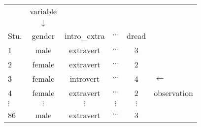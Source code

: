 \documentclass[convert]{standalone}
\begin{document}
    
\begin{tabular}{l cccc l}
		& variable \\
		& $\downarrow$	 \\
\cline{1-5}
Stu.	&	gender	&	intro\_extra & $\cdots$ & dread \\
\cline{1-5}
1 & male   & extravert  & $\cdots$  & 3 \\ 
2 & female & extravert  & $\cdots$  & 2 \\ 
3 & female & introvert  & $\cdots$  & 4 & $\leftarrow$  \\ 
4 & female & extravert  & $\cdots$  & 2 & observation \\
$\vdots$	 &	$\vdots$	&	$\vdots$  &	$\vdots$ &	$\vdots$ \\
86	& male & extravert  & $\cdots$  & 3 \\
\cline{1-5}
\end{tabular}
\end{document}
